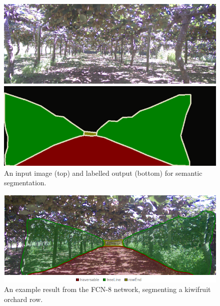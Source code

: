 \documentclass[preprint,authoryear,12pt]{elsarticle}
\begin{document}
        \begin{figure}[htb]
        
            \centering
            \includegraphics[width=\linewidth]{imgs/photos/segImgLabelPair_trimmed.png}
            \caption{
                An input image (top) and labelled output (bottom) for semantic segmentation.
            }
            \label{fig:segImgLabelPair}
        \end{figure}

        \begin{figure}[htb]
            \centering
            \includegraphics[width=\linewidth]{imgs/photos/semSegRowResults.png}
            \caption{
                An example result from the FCN-8 network, segmenting a kiwifruit orchard row.
            }
            \label{fig:semSegRowResults}
        \end{figure}
\end{document}
